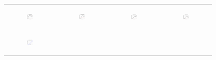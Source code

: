\begin{figure}[ht]
\begin{tabular}{cccc}
\begin{subfigure}[b]{0.22\textwidth}
	  	\includegraphics[width=105pt]{images/diffFA_CF2G_friendster10M_maxgraphcut.pdf}
			\caption{}
			\label{appfig:diffFA_CF2G_friendster10M_maxgraphcut}
	  \end{subfigure} &
	  \begin{subfigure}[b]{0.22\textwidth}
	  	\includegraphics[width=105pt]{images/diffFA_CF2G_arabic2005_maxgraphcut.pdf}
			\caption{}
			\label{appfig:diffFA_CF2G_arabic2005_maxgraphcut}
	  \end{subfigure} &
	  \begin{subfigure}[b]{0.22\textwidth}
	  	\includegraphics[width=105pt]{images/diffFA_CF2G_uk2005_maxgraphcut.pdf}
			\caption{}
			\label{appfig:diffFA_CF2G_uk2005_maxgraphcut}
	  \end{subfigure} &
	  \begin{subfigure}[b]{0.22\textwidth}
	  	\includegraphics[width=105pt]{images/diffFA_CF2G_it2004_maxgraphcut.pdf}
			\caption{}
			\label{appfig:diffFA_CF2G_it2004_maxgraphcut}
	  \end{subfigure} \\
	  \begin{subfigure}[b]{0.22\textwidth}
	  	\includegraphics[width=105pt]{images/validated_CC2G_friendster10M_maxgraphcut.pdf}

\end{subfigure}
\end{tabular}
\end{figure}
